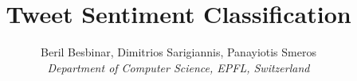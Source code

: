 \documentclass[10pt,conference,compsocconf]{IEEEtran}
\begin{document}
\title{Tweet Sentiment Classification}

\author{Beril Besbinar, Dimitrios Sarigiannis, Panayiotis Smeros\\
\textit{Department of Computer Science, EPFL, Switzerland}}

\maketitle


















\cleardoublepage


\end{document}

